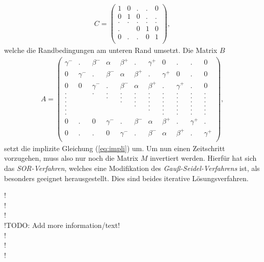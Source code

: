 \documentclass[12pt,a4paper,titlepage,headinclude,bibtotoc]{scrartcl}
\begin{document}
 \begin{align*}
 C  =
  \begin{pmatrix}
  1  & 0 & . & . & 0 \\
  0  & 1 & 0 & . & . \\
  .  & . & . & . & . \\
  .  &   & 0 & 1 & 0 \\
  0  & . & . & 0 & 1 \\
  \end{pmatrix}
  ,
\end{align*}
\setcounter{MaxMatrixCols}{25}
welche die Randbedingungen am unteren Rand umsetzt. Die Matrix $B$
\begin{align*}
A =
  \begin{pmatrix}
  \gamma^-  & . & \beta^- & \alpha & \beta^+ & . & \gamma^+ & 0 & .& .& 0 \\
  0  & \gamma^- & . & \beta^- & \alpha  & \beta^+  & .  & \gamma^+  & 0 &  .& 0 \\
  0  & 0 & \gamma^- & . & \beta^- & \alpha & \beta^+ & .  & \gamma^+  & .& 0 \\
  .  &   & . & . & . & . & .  & .  & .  & .  & . \\
  .  &   &   & . & . & . & . & .  & .  & .  & . \\
  .  &   &   &   & . & . & . & . & . & .  & . \\
  .  &   &   &   &   & . & . & . & . & . & .  \\
  .  &   &   &   &   &   & . & . & . & .  & . \\
  .  &   &   &   &   &   &   & . & . & .  & . \\
  0  & . & 0 & \gamma^- & . & \beta^- & \alpha & \beta^+ & .  & \gamma^+  & . \\
  0  & . & . & 0 & \gamma^- & . & \beta^- & \alpha & \beta^+ & .  & \gamma^+  \\
 \end{pmatrix}
 ,
 \end{align*}
setzt die implizite Gleichung (\ref{eq:impli}) um. Um nun einen Zeitschritt vorzugehen, muss also nur noch die Matrix $M$ invertiert werden. Hierfür hat sich das \textit{SOR-Verfahren}, welches eine Modifikation des \textit{Gauß-Seidel-Verfahrens} ist, als besonders geeignet herausgestellt. Dies sind beides iterative Lösungsverfahren.

!\\! \\! \\
		!TODO: Add more information/text!
\\! \\ !\\!
\end{document}
